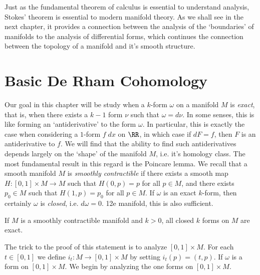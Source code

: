 Just as the fundamental theorem of calculus is essential to understand analysis, Stokes' theorem is essential to modern manifold theory. As we shall see in the next chapter, it provides a connection between the analysis of the `boundaries' of manifolds to the analysis of differential forms, which continues the connection between the topology of a manifold and it's smooth structure.

\chapter{Basic De Rham Cohomology}

Our goal in this chapter will be study when a $k$-form $\omega$ on a manifold $M$ is \emph{exact}, that is, when there exists a $k-1$ form $\nu$ such that $\omega = d\nu$. In some senses, this is like forming an `antiderivative' to the form $\omega$. In particular, this is exactly the case when considering a $1$-form $f\; dx$ on $\RR$, in which case if $dF = f$, then $F$ is an antiderivative to $f$. We will find that the ability to find such antiderivatives depends largely on the `shape' of the manifold $M$, i.e. it's homology class. The most fundamental result in this regard is the Poincare lemma. We recall that a smooth manifold $M$ is \emph{smoothly contractible} if there exists a smooth map $H: [0,1] \times M \to M$ such that $H(0,p) = p$ for all $p \in M$, and there exists $p_0 \in M$ such that $H(1,p) = p_0$ for all $p \in M$. If $\omega$ is an exact $k$-form, then certainly $\omega$ is \emph{closed}, i.e. $d\omega = 0$. 12e manifold, this is also sufficient.

\begin{lemma}
    If $M$ is a smoothly contractible manifold and $k > 0$, all closed $k$ forms on $M$ are exact.
\end{lemma}

The trick to the proof of this statement is to analyze $[0,1] \times M$. For each $t \in [0,1]$ we define $i_t: M \to [0,1] \times M$ by setting $i_t(p) = (t,p)$. If $\omega$ is a form on $[0,1] \times M$. We begin by analyzing the one forms on $[0,1] \times M$.

